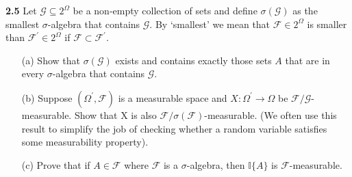 \noindent\textbf{2.5}
Let $\mathcal{G}\subseteq 2^{\Omega}$ be a non-empty collection of sets and define $\sigma(\mathcal{G})$ as the smallest
$\sigma$-algebra that contains $\mathcal{G}$. By `smallest' we mean that $\mathcal{F}\in 2^{\Omega}$ is smaller than
$\mathcal{F}^{\prime}\in 2^{\Omega}$ if $\mathcal{F}\subset \mathcal{F}^{\prime}$.
\begin{enumerate}
    \item[(a)] Show that $\sigma(\mathcal{G})$ exists and contains exactly those sets $A$ that are in every
    $\sigma$-algebra that contains $\mathcal{G}$.
    \item[(b)] Suppose $(\Omega^{\prime},\mathcal{F})$ is a measurable space and $X:\Omega^{\prime}\rightarrow \Omega$ be $\mathcal{F}/\mathcal{G}$-measurable. Show that X is also $\mathcal{F}/\sigma(\mathcal{F})$-measurable. (We often use this result to simplify the job of checking whether a random variable satisfies some measurability property).
    \item[(c)] Prove that if $A\in \mathcal{F}$ where $\mathcal{F}$ is a $\sigma$-algebra, then $\mathbb{I}\{A\}$ is $\mathcal{F}$-measurable.
\end{enumerate}

